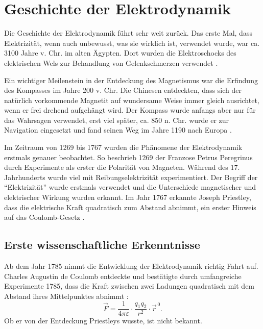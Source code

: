 %
%
%
\section{Geschichte der Elektrodynamik\label{maxwell:section:teil0}}

Die Geschichte der Elektrodynamik führt sehr weit zurück.
%
Das erste Mal, dass Elektrizität, wenn auch unbewusst, was sie wirklich ist, verwendet wurde, war ca. 3100 Jahre v. Chr. im alten Ägypten.
%
Dort wurden die Elektroschocks des elektrischen Wels zur Behandlung von Gelenkschmerzen verwendet \cite{maxwell:History_of_bioelectricity}.
%
%
%

Ein wichtiger Meilenstein in der Entdeckung des Magnetismus war die Erfindung des Kompasses im Jahre 200 v. Chr.
%
Die Chinesen entdeckten, dass sich der natürlich vorkommende Magnetit auf wundersame Weise immer gleich ausrichtet, wenn er frei drehend aufgehängt wird.
%
Der Kompass wurde anfangs aber nur für das Wahrsagen verwendet, erst viel später, ca. 850 n. Chr. wurde er zur Navigation eingesetzt und fand seinen Weg im Jahre 1190 nach Europa \cite{maxwell:History_of_the_compass}.
%
%
%

Im Zeitraum von 1269 bis 1767 wurden die Phänomene der Elektrodynamik erstmals genauer beobachtet.
So beschrieb 1269 der Franzose Petrus Peregrinus durch Experimente als erster die Polarität von Magneten.
%
Während des 17. Jahrhunderts wurde viel mit Reibungselektrizität experimentiert. Der Begriff der ``Elektrizität'' wurde erstmals verwendet und die Unterschiede magnetischer und elektrischer Wirkung wurden erkannt.
%
%
Im Jahr 1767 erkannte Joseph Priestley, dass die elektrische Kraft quadratisch zum Abstand abnimmt, ein erster Hinweis auf das Coulomb-Gesetz \cite{maxwell:History_of_electromagnetic_theory}.
%
%
%

\subsection{Erste wissenschaftliche Erkenntnisse}
Ab dem Jahr 1785 nimmt die Entwicklung der Elektrodynamik richtig Fahrt auf.
Charles Augustin de Coulomb entdeckte und bestätigte durch umfangreiche Experimente 1785, dass die Kraft zwischen zwei Ladungen quadratisch mit dem Abstand ihres Mittelpunktes abnimmt \cite{maxwell:Charles-Augustin_de_Coulomb}:
%
\[
\vec{F}
=
\frac{1}{4 \pi \varepsilon}
\cdot
\frac{q_1 q_2}{r^2}
\cdot
\vec{r}^{\,0}.
\]
Ob er von der Entdeckung Priestleys wusste, ist nicht bekannt.

